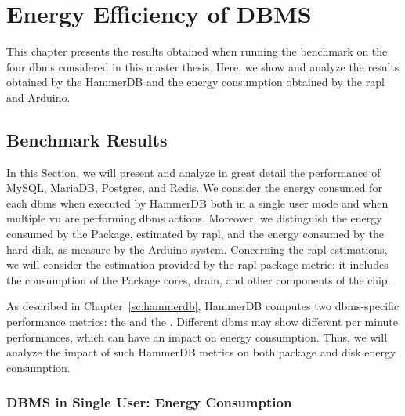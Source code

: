 \chapter{Energy Efficiency of DBMS}
\label{cha:Results}


This chapter presents the results obtained when running the benchmark on the four \gls{dbms} considered in this master thesis. Here, we show and analyze the results obtained by the HammerDB and the energy consumption obtained by the \gls{rapl} and Arduino.
\section{Benchmark Results}


In this Section, we will present and analyze in great detail the performance of MySQL, MariaDB, Postgres, and Redis. We consider the energy consumed for each \gls{dbms} when executed by HammerDB both in a single user mode and when multiple \gls{vu} are performing \gls{dbms} actions. Moreover, we distinguish the energy consumed by the Package, estimated by \gls{rapl}, and the energy consumed by the hard disk, as measure by the Arduino system. Concerning the \gls{rapl} estimations, we will consider the estimation provided by the \gls{rapl} package metric: it includes the consumption of the Package cores, \gls{dram}, and other components of the chip. 

As described in Chapter~\ref{sc:hammerdb}, HammerDB computes two \gls{dbms}-specific performance metrics: the  and the . Different \gls{dbms} may show different per minute performances, which can have an impact on energy consumption. Thus, we will analyze the impact of such HammerDB metrics on both package and disk energy consumption. 

\subsection{DBMS in Single User: Energy Consumption}



